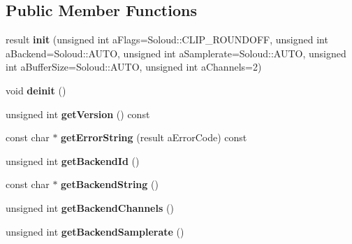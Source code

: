 \subsection*{Public Member Functions}
\begin{DoxyCompactItemize}
\item 
\mbox{\label{class_so_loud_1_1_soloud_ad0d7e608a0607aa4f82382c48210058a}} 
result {\bfseries init} (unsigned int a\+Flags=Soloud\+::\+C\+L\+I\+P\+\_\+\+R\+O\+U\+N\+D\+O\+FF, unsigned int a\+Backend=Soloud\+::\+A\+U\+TO, unsigned int a\+Samplerate=Soloud\+::\+A\+U\+TO, unsigned int a\+Buffer\+Size=Soloud\+::\+A\+U\+TO, unsigned int a\+Channels=2)
\item 
\mbox{\label{class_so_loud_1_1_soloud_a4a9787e28373943fbf75b91eeb49e39d}} 
void {\bfseries deinit} ()
\item 
\mbox{\label{class_so_loud_1_1_soloud_ad20993bd06c7bbd73cf841b322b5f4d8}} 
unsigned int {\bfseries get\+Version} () const
\item 
\mbox{\label{class_so_loud_1_1_soloud_a7201baa666cdf376e3a306b80b71ba43}} 
const char $\ast$ {\bfseries get\+Error\+String} (result a\+Error\+Code) const
\item 
\mbox{\label{class_so_loud_1_1_soloud_a1db83b486cbf00062b267c3cdaca6f1a}} 
unsigned int {\bfseries get\+Backend\+Id} ()
\item 
\mbox{\label{class_so_loud_1_1_soloud_a92dd8f90c1e44b7dbaff7c6422832d1c}} 
const char $\ast$ {\bfseries get\+Backend\+String} ()
\item 
\mbox{\label{class_so_loud_1_1_soloud_afe47adf7d9009bedc71265bf97e1ffd6}} 
unsigned int {\bfseries get\+Backend\+Channels} ()
\item 
\mbox{\label{class_so_loud_1_1_soloud_a1e8cd90a27fc3f1cc9e3b2fc414750fe}} 
unsigned int {\bfseries get\+Backend\+Samplerate} ()
\item 
\mbox{\label{class_so_loud_1_1_soloud_a0dcf47a9f712d0bb693cff85ca8683cd}} 

\end{DoxyCompactItemize}
